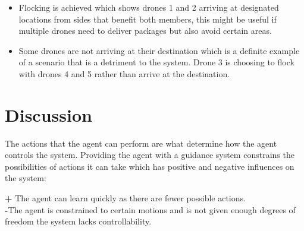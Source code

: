 \begin{itemize}
\item
Flocking is achieved which shows drones 1 and 2 arriving at designated locations from sides that benefit both members, this might be useful if multiple drones need to deliver packages but also avoid certain areas. 

\item
Some drones are not arriving at their destination which is a definite example of a scenario that is a detriment to the system. Drone 3 is choosing to flock with drones 4 and 5 rather than arrive at the destination. 

\end{itemize}
\clearpage
\section{Discussion}
The actions that the agent can perform are what determine how the agent controls the system. Providing the agent with a guidance system constrains the possibilities of actions it can take which has positive and negative influences on the system:\vspace{0.2cm}

\noindent
\textbf{+} The agent can learn quickly as there are fewer possible actions.\\

\noindent
\textbf{-}The agent is constrained to certain motions and is not given enough degrees of freedom the system lacks controllability.\cite{con2}\hfill\vspace{0.2cm}

